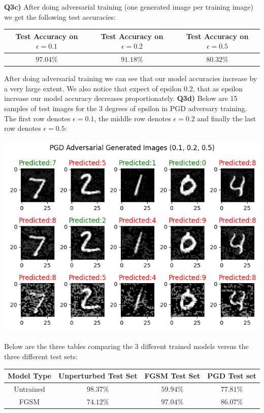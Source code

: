 \documentclass{article}
\begin{document}
\begin{titlepage}
\textbf{Q3c)} After doing adversarial training (one generated image per training image) we get the following test accuracies:

\begin{center}
\begin{tabular}{|c | c |c |} 
 \hline
 Test Accuracy on $ \epsilon = 0.1$ & Test Accuracy on $ \epsilon = 0.2$ & Test Accuracy on $ \epsilon = 0.5$ \\ [0.5ex] 
 \hline
 $97.04\%$ & $91.18\%$ & $80.32\%$ \\ 
 \hline
\end{tabular}
\end{center}
After doing adversarial training we can see that our model accuracies increase by a very large extent. We also notice that expect of epsilon 0.2, that as epsilon increase our model accuracy decreases proportionately. 
\newpage
\textbf{Q3d)} Below are 15 samples of test images for the 3 degrees of epsilon in PGD adversary training. The first row denotes $\epsilon = 0.1$, the middle row denotes $\epsilon = 0.2$ and finally the last row denotes $\epsilon = 0.5$: 
\begin{center}
\includegraphics[width=.8\linewidth]{q3bPGD.png}
\end{center}
Below are the three tables comparing the 3 different trained models versus the three different test sets:
\begin{center}
\begin{tabular}{| c || c | c | c |} 
 \hline
Model Type & Unperturbed Test Set  & FGSM Test Set & PGD Test set\\ [0.5ex] 
 \hline
 Untrained & $98.37\%$ & $59.94\%$ & $77.81\%$ \\ 
 \hline
 FGSM & $74.12\%$ & $97.04\%$ & $86.07\%$ \\ 

\end{tabular}
\end{center}
\end{titlepage}
\end{document}
